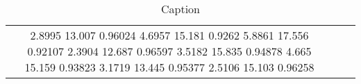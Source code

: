 
\begin{table}
    \centering
    \begin{tabular}{ccc}
2.8995	13.007	0.96024
4.6957	15.181	0.9262
5.8861	17.556	0.92107
2.3904	12.687	0.96597
3.5182	15.835	0.94878
4.665	15.159	0.93823
3.1719	13.445	0.95377
2.5106	15.103	0.96258


        
    \end{tabular}
    \caption{Caption}
    \label{tab:my_label}
\end{table}